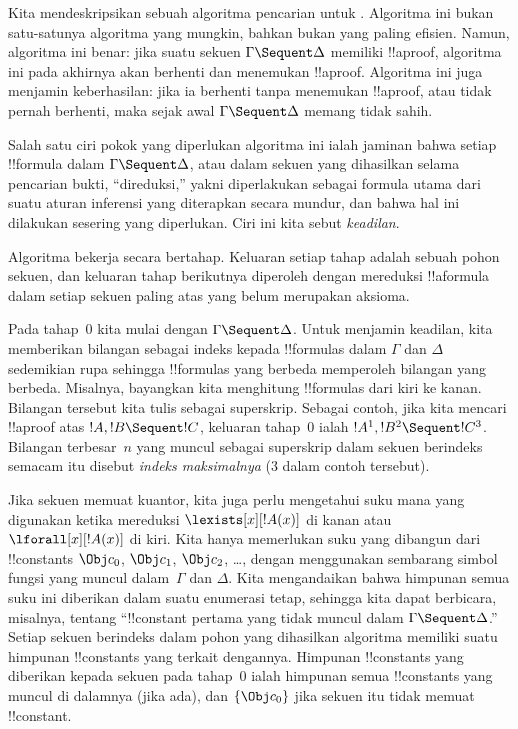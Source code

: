 \documentclass[../../../include/open-logic-section]{subfiles}
\begin{document}


Kita mendeskripsikan sebuah algoritma pencarian untuk .
Algoritma ini bukan satu-satunya algoritma yang mungkin, bahkan bukan
yang paling efisien. Namun, algoritma ini benar: jika suatu sekuen
$\Gamma \Sequent \Delta$ memiliki !!a{proof}, algoritma ini pada akhirnya
akan berhenti dan menemukan !!a{proof}. Algoritma ini juga menjamin keberhasilan:
jika ia berhenti tanpa menemukan !!a{proof}, atau tidak pernah berhenti,
maka sejak awal $\Gamma \Sequent \Delta$ memang tidak sahih.

Salah satu ciri pokok yang diperlukan algoritma ini ialah jaminan bahwa
setiap !!{formula} dalam $\Gamma \Sequent \Delta$, atau dalam sekuen yang
dihasilkan selama pencarian bukti, ``direduksi,'' yakni diperlakukan
sebagai formula utama dari suatu aturan inferensi yang diterapkan secara
mundur, dan bahwa hal ini dilakukan sesering yang diperlukan. Ciri ini
kita sebut \emph{keadilan}.

Algoritma bekerja secara bertahap. Keluaran setiap tahap adalah sebuah
pohon sekuen, dan keluaran tahap berikutnya diperoleh dengan mereduksi
!!a{formula} dalam setiap sekuen paling atas yang belum merupakan aksioma.

Pada tahap~$0$ kita mulai dengan $\Gamma \Sequent \Delta$. Untuk menjamin
keadilan, kita memberikan bilangan sebagai indeks kepada !!{formula}s
dalam $\Gamma$ dan $\Delta$ sedemikian rupa sehingga !!{formula}s yang
berbeda memperoleh bilangan yang berbeda. Misalnya, bayangkan kita
menghitung !!{formula}s dari kiri ke kanan. Bilangan tersebut kita tulis
sebagai superskrip. Sebagai contoh, jika kita mencari !!a{proof} atas
$!A, !B \Sequent !C$, keluaran tahap~$0$ ialah $!A^1, !B^2 \Sequent
!C^3$. Bilangan terbesar~$n$ yang muncul sebagai superskrip dalam sekuen
berindeks semacam itu disebut \emph{indeks maksimalnya} ($3$ dalam contoh
tersebut).

Jika sekuen memuat kuantor, kita juga perlu mengetahui suku mana yang
digunakan ketika mereduksi $\lexists[x][!A(x)]$ di kanan atau
$\lforall[x][!A(x)]$ di kiri. Kita hanya memerlukan suku yang dibangun
dari !!{constant}s $\Obj c_0$, $\Obj c_1$, $\Obj c_2$, \dots, dengan
menggunakan sembarang simbol fungsi yang muncul dalam~$\Gamma$ dan
$\Delta$. Kita mengandaikan bahwa himpunan semua suku ini diberikan dalam
suatu enumerasi tetap, sehingga kita dapat berbicara, misalnya, tentang
``!!{constant} pertama yang tidak muncul dalam $\Gamma \Sequent
\Delta$.'' Setiap sekuen berindeks dalam pohon yang dihasilkan algoritma
memiliki suatu himpunan !!{constant}s yang terkait dengannya. Himpunan
!!{constant}s yang diberikan kepada sekuen pada tahap~$0$ ialah himpunan
semua !!{constant}s yang muncul di dalamnya (jika ada), dan
$\{\Obj c_0\}$ jika sekuen itu tidak memuat !!{constant}.
\end{document}
